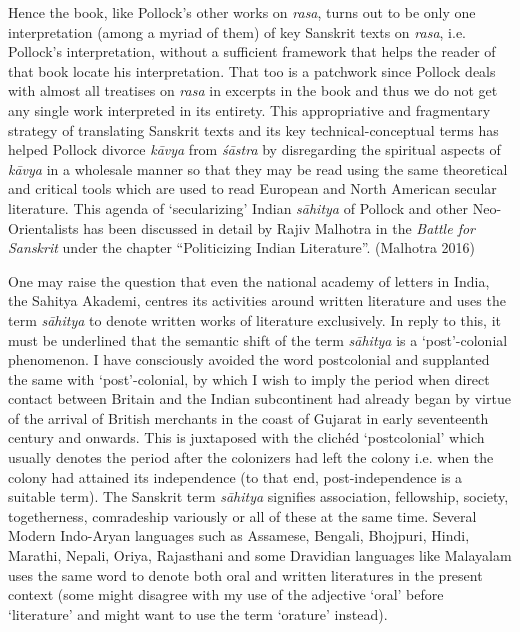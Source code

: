 Hence the book, like Pollock’s other works on \textsl{rasa}, turns out to be only one interpretation (among a myriad of them) of key Sanskrit texts on \textsl{rasa}, i.e. Pollock’s interpretation, without a sufficient framework that helps the reader of that book locate his interpretation. That too is a patchwork since Pollock deals with almost all treatises on \textsl{rasa} in excerpts in the book and thus we do not get any single work interpreted in its entirety. This appropriative and fragmentary strategy of translating Sanskrit texts and its key technical-conceptual terms has helped Pollock divorce \textsl{kāvya} from \textsl{śāstra} by disregarding the spiritual aspects of \textsl{kāvya} in a wholesale manner so that they may be read using the same theoretical and critical tools which are used to read European and North American secular literature. This agenda of ‘secularizing’ Indian \textsl{sāhitya} of Pollock and other Neo-Orientalists has been discussed in detail by Rajiv Malhotra in the \textsl{Battle for Sanskrit} under the chapter “Politicizing Indian Literature”. (Malhotra 2016) 

One may raise the question that even the national academy of letters in India, the Sahitya Akademi, centres its activities around written literature and uses the term \textsl{sāhitya} to denote written works of literature exclusively. In reply to this, it must be underlined that the semantic shift of the term \textsl{sāhitya} is a ‘post’-colonial phenomenon. I have consciously avoided the word postcolonial and supplanted the same with ‘post’-colonial, by which I wish to imply the period when direct contact between Britain and the Indian subcontinent had already began by virtue of the arrival of British merchants in the coast of Gujarat in early seventeenth century and onwards. This is juxtaposed with the clichéd ‘postcolonial’ which usually denotes the period after the colonizers had left the colony i.e. when the colony had attained its independence (to that end, post-independence is a suitable term). The Sanskrit term \textsl{sāhitya} signifies association, fellowship, society, togetherness, comradeship variously or all of these at the same time. Several Modern Indo-Aryan languages such as Assamese, Bengali, Bhojpuri, Hindi, Marathi, Nepali, Oriya, Rajasthani and some Dravidian languages like Malayalam uses the same word to denote both oral and written literatures in the present context (some might disagree with my use of the adjective ‘oral’ before ‘literature’ and might want to use the term ‘orature’ instead).\\[-21pt]

